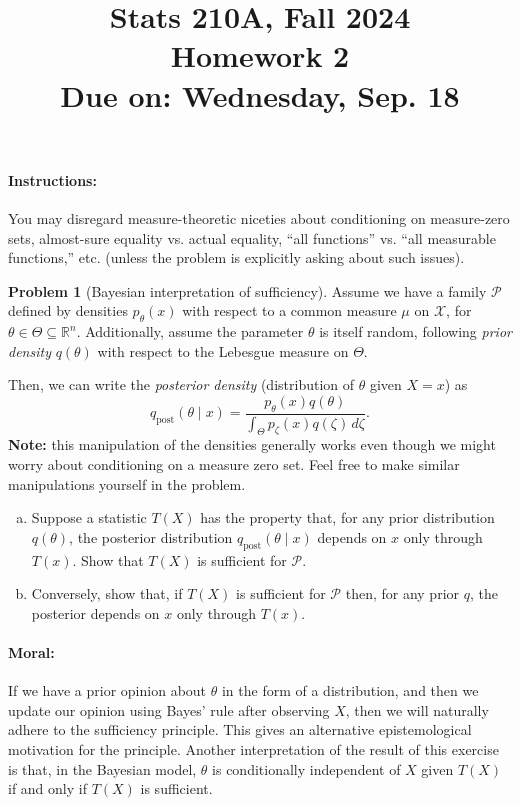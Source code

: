 \documentclass{article}
\newcommand{\cP}{\mathcal{P}}
\newcommand{\cX}{\mathcal{X}}
\newcommand{\RR}{\mathbb{R}}
\theoremstyle{definition}
\newtheorem{problem}{Problem}
\begin{document}
\title{Stats 210A, Fall 2024\\
  Homework 2 \\
  {\large {\bf Due on}: Wednesday, Sep. 18}}
\date{}

\maketitle

\paragraph{Instructions:} You may disregard measure-theoretic niceties about conditioning on measure-zero sets, almost-sure equality vs. actual equality, ``all functions'' vs. ``all measurable functions,'' etc. (unless the problem is explicitly asking about such issues).

\begin{problem}[Bayesian interpretation of sufficiency]
  Assume we have a family $\cP$ defined by densities $p_{\theta}(x)$ with respect to a common measure $\mu$ on $\cX$, for $\theta\in \Theta \subseteq \RR^n$. Additionally, assume the parameter $\theta$ is itself random, following {\em prior density} $q(\theta)$ with respect to the Lebesgue measure on $\Theta$. 

  Then, we can write the {\em posterior density} (distribution of $\theta$ given $X=x$) as
  \[
  q_{\text{post}}(\theta \mid x) = \frac{p_\theta(x)q(\theta)}{\int_{\Theta} p_\zeta(x)q(\zeta) \,d \zeta}.
  \]
  {\bf Note:} this manipulation of the densities generally works even though we might worry about conditioning on a measure zero set. Feel free to make similar manipulations yourself in the problem.

  \begin{enumerate}[(a)]
  \item Suppose a statistic $T(X)$ has the property that, for any prior distribution $q(\theta)$, the posterior distribution $q_{\text{post}}(\theta \mid x)$ depends on $x$ only through $T(x)$. Show that $T(X)$ is sufficient for $\cP$.

    
    
  \item Conversely, show that, if $T(X)$ is sufficient for $\cP$ then, for any prior $q$, the posterior depends on $x$ only through $T(x)$.
    
    

  \end{enumerate}

\paragraph{Moral:} If we have a prior opinion about $\theta$ in the form of a distribution, and then we update our opinion using Bayes' rule after observing $X$, then we will naturally adhere to the sufficiency principle. This gives an alternative epistemological motivation for the principle. Another interpretation of the result of this exercise is that, in the Bayesian model, $\theta$ is conditionally independent of $X$ given $T(X)$ if and only if $T(X)$ is sufficient.

\end{problem}
\end{document}

